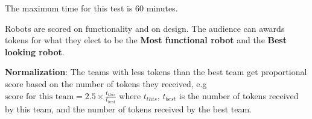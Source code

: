 The maximum time for this test is 60 minutes.

Robots are scored on functionality and on design.
The audience can awards tokens for what they elect to be the \textbf{Most functional robot} and the \textbf{Best looking robot}.

\begin{scorelist}



\end{scorelist}

\textbf{Normalization}: The teams with less tokens than the best team get proportional score based
on the number of tokens they received, e.g 
$\text{score for this team} = 2.5 \times \frac{t_{this}}{t_{best}}$
where $t_{this}$, $t_{best}$ is the number of tokens received by this team, and the number of tokens received by the best team.


